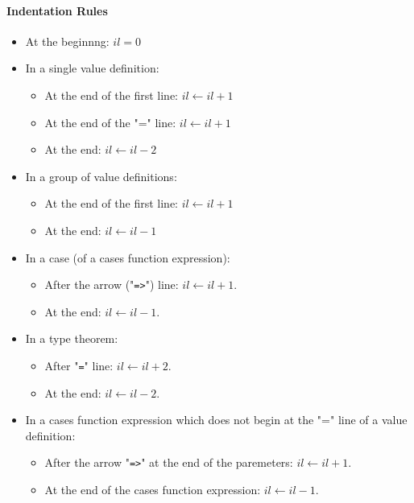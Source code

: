 \documentclass{article}
\begin{document}
\paragraph{Indentation Rules}
\begin{itemize}

\item
At the beginnng: $il = 0$

\item
In a single value definition:
  \begin{itemize}

  \item
  At the end of the first line: $il \leftarrow il + 1$

  \item
  At the end of the "=" line: $il \leftarrow il + 1$

  \item
  At the end: $il \leftarrow il - 2$
  \end{itemize}

\item
In a group of value definitions:
  \begin{itemize}

  \item
  At the end of the first line: $il \leftarrow il + 1$

  \item
  At the end: $il \leftarrow il - 1$
  \end{itemize}

\item
In a case (of a cases function expression):
  \begin{itemize}

  \item
  After the arrow ("\texttt{=>}") line: $il \leftarrow il + 1$.

  \item
  At the end: $il \leftarrow il - 1$.
  \end{itemize}

\item
In a type theorem:
  \begin{itemize}

  \item
  After "\texttt{=}" line: $il \leftarrow il + 2$.

  \item
  At the end: $il \leftarrow il - 2$.
  \end{itemize}

\item
In a cases function expression which does not begin at the "=" line of a value
definition:
  \begin{itemize}

  \item
  After the arrow "\texttt{=>}" at the end of the paremeters: $il \leftarrow il + 1$.

  \item
  At the end of the cases function expression: $il \leftarrow il - 1$.

  \end{itemize}

\end{itemize}
\end{document}
